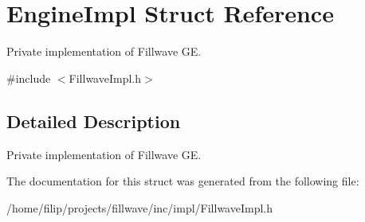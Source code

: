 \hypertarget{structEngineImpl}{}\section{Engine\+Impl Struct Reference}
\label{structEngineImpl}


Private implementation of Fillwave GE.  




{\ttfamily \#include $<$Fillwave\+Impl.\+h$>$}



\subsection{Detailed Description}
Private implementation of Fillwave GE. 

The documentation for this struct was generated from the following file\+:\begin{DoxyCompactItemize}
\item 
/home/filip/projects/fillwave/inc/impl/Fillwave\+Impl.\+h\end{DoxyCompactItemize}
